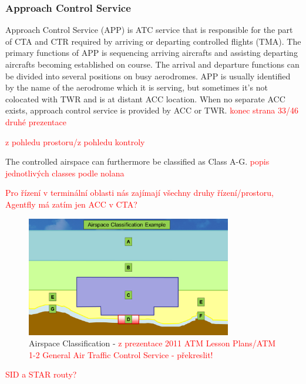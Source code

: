 \subsubsection{Approach Control Service}
Approach Control Service (APP) is ATC service that is responsible for the part of CTA and CTR required by arriving or departing controlled flights (TMA). The primary functions of APP is sequencing arriving aircrafts and assisting departing aircrafts becoming established on course. The arrival and departure functions can be divided into several positions on busy aerodromes. APP is usually identified by the name of the aerodrome which it is serving, but sometimes it's not colocated with TWR and is at distant ACC location. When no separate ACC exists, approach control service is provided by ACC or TWR. \textcolor{red}{konec strana 33/46 druhé prezentace} \cite[Chapter 3.2]{annex11}

\textcolor{red}{z pohledu prostoru/z pohledu kontroly}

The controlled airspace can furthermore be classified as Class A-G. \cite[\textcolor{red}{kapitola}]{nolan} \textcolor{red}{popis jednotlivých classes podle nolana}

\textcolor{red}{Pro řízení v terminální oblasti nás zajímají všechny druhy řízení/prostoru, Agentfly má zatím jen ACC v CTA?}

\begin{figure}[h]
    \centering
    \includegraphics[width=0.8\textwidth]{figures/classes.png}
    \caption{Airspace Classification - \textcolor{red}{z prezentace 2011 ATM Lesson Plans/ATM 1-2 General Air Traffic Control Service \cite {nolan} - překreslit!}}
    \label{fig:classes}
\end{figure}

\textcolor{red}{SID a STAR routy?}